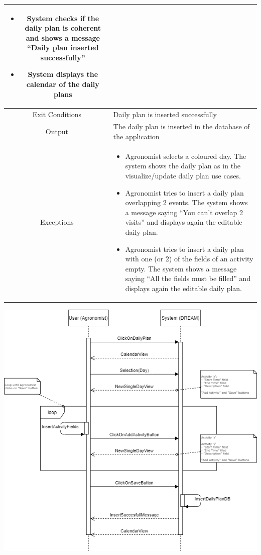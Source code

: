 \documentclass{article}
\begin{document}
\begin{center}
\begin{longtable}{|c| p{10cm}|}
\begin{itemize}
\begin{itemize}
                                            \end{itemize}
                                \item System checks if the daily plan is coherent and shows a message “Daily plan inserted successfully”
                                \item System displays the calendar of the daily plans
                            \end{itemize} \\
        \hline
            Exit Conditions & Daily plan is inserted successfully \\
        \hline
            Output & The daily plan is inserted in the database of the application\\
        \hline
            Exceptions & \begin{itemize}
                            \item Agronomist selects a coloured day. The system shows the daily plan as in the visualize/update daily plan use cases.
                            \item Agronomist tries to insert a daily plan overlapping 2 events. The system shows a message saying “You can’t overlap 2 visits” and displays again the editable daily plan.
                            \item Agronomist tries to insert a daily plan with one (or 2) of the fields of an activity empty. The system shows a message saying “All the fields must be filled” and displays again the editable daily plan.
                        \end{itemize}\\
        \hline
    \end{longtable}
    
    \newpage
    
    \includegraphics[width=1.0\textwidth]{images/sequenceDiagrams/17. AgronomistInsertDailyPlan.png}
    \par
    \caption{\label{fig:frog}Agronomist inserts daily plan}


\end{center}
\end{document}
